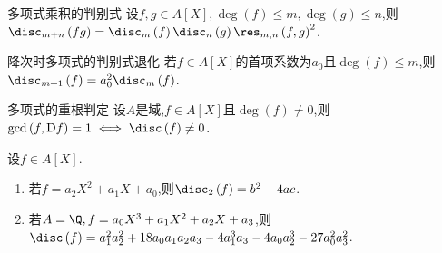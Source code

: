 \begin{corollary}{多项式乘积的判别式}{}
	设$f,g\in A[X],\deg\left(f\right)\leq m,\deg\left(g\right)\leq n$,则$\disc_{m+n}\left(fg\right)=\disc_{m}\left(f\right)\disc_{n}\left(g\right)\res_{m,n}\left(f,g\right)^{2}$.
\end{corollary}

\begin{corollary}{降次时多项式的判别式退化}{}
	若$f\in A[X]$的首项系数为$a_{0}$且$\deg\left(f\right)\leq m$,则$\disc_{m+1}\left(f\right)=a_{0}^{2}\disc_{m}\left(f\right)$.
\end{corollary}

\begin{corollary}{多项式的重根判定}{}
	设$A$是域,$f\in A[X]$且$\deg\left(f\right)\neq 0$,则$\gcd\left(f,\mathrm{D}f\right)=1\iff\disc\left(f\right)\neq 0$.
\end{corollary}

\begin{example}{}{}
	设$f\in A[X]$.
	\begin{enumerate}
		\item 若$f=a_{2}X^{2}+a_{1}X+a_{0}$,则$\disc_{2}\left(f\right)=b^{2}-4ac$.
		\item 若$A=\Q,f=a_{0}X^{3}+a_{1}X^{2}+a_{2}X+a_{3}$,则$\disc\left(f\right)=a_{1}^{2}a_{2}^{2}+18a_{0}a_{1}a_{2}a_{3}-4a_{1}^{3}a_{3}-4a_{0}a_{2}^{3}-27a_{0}^{2}a_{3}^{2}$.
	\end{enumerate}
\end{example}












